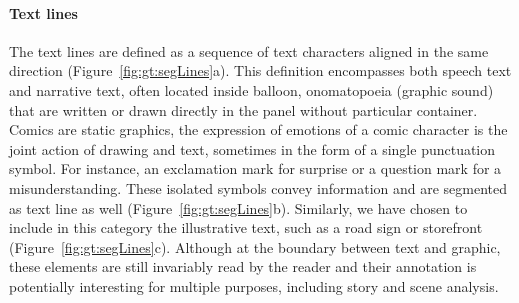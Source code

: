 \paragraph{Text lines} %
\label{par:text_lines}
The text lines are defined as a sequence of text characters aligned in the same direction (Figure~\ref{fig:gt:segLines}a).
This definition encompasses both speech text and narrative text, often located inside balloon, onomatopoeia (graphic sound) that are written or drawn directly in the panel without particular container.
Comics are static graphics, the expression of emotions of a comic character is the joint action of drawing and text, sometimes in the form of a single punctuation symbol.
For instance, an exclamation mark for surprise or a question mark for a misunderstanding.
These isolated symbols convey information and are segmented as text line as well (Figure~\ref{fig:gt:segLines}b).
Similarly, we have chosen to include in this category the illustrative text, such as a road sign or storefront (Figure~\ref{fig:gt:segLines}c).
Although at the boundary between text and graphic, these elements are still invariably read by the reader and their annotation is potentially interesting for multiple purposes, including story and scene analysis.

